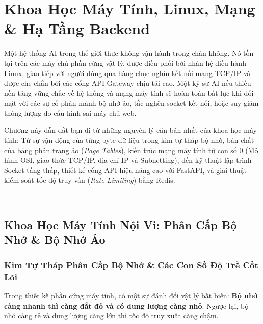 
\chapter{Khoa Học Máy Tính, Linux, Mạng \& Hạ Tầng Backend}
\label{ch:systems-networking}

Một hệ thống AI trong thế giới thực không vận hành trong chân không. Nó tồn tại trên các máy chủ phần cứng vật lý, được điều phối bởi nhân hệ điều hành Linux, giao tiếp với người dùng qua hàng chục nghìn kết nối mạng TCP/IP và được che chắn bởi các cổng API Gateway chịu tải cao. Một kỹ sư AI nếu thiếu nền tảng vững chắc về hệ thống và mạng máy tính sẽ hoàn toàn bất lực khi đối mặt với các sự cố phân mảnh bộ nhớ ảo, tắc nghẽn socket kết nối, hoặc suy giảm thông lượng do cấu hình sai máy chủ web.

Chương này dẫn dắt bạn đi từ những nguyên lý căn bản nhất của khoa học máy tính: Từ sự vận động của từng byte dữ liệu trong kim tự tháp bộ nhớ, bản chất của bảng phân trang ảo (\textit{Page Tables}), kiến trúc mạng máy tính từ con số 0 (Mô hình OSI, giao thức TCP/IP, địa chỉ IP và Subnetting), đến kỹ thuật lập trình Socket tầng thấp, thiết kế cổng API hiệu năng cao với FastAPI, và giải thuật kiểm soát tốc độ truy vấn (\textit{Rate Limiting}) bằng Redis.

---

\section{Khoa Học Máy Tính Nội Vi: Phân Cấp Bộ Nhớ \& Bộ Nhớ Ảo}
\label{sec:memory-hierarchy-paging}

\subsection{Kim Tự Tháp Phân Cấp Bộ Nhớ \& Các Con Số Độ Trễ Cốt Lõi}
Trong thiết kế phần cứng máy tính, có một sự đánh đổi vật lý bất biến: \textbf{Bộ nhớ càng nhanh thì càng đắt đỏ và có dung lượng càng nhỏ}. Ngược lại, bộ nhớ càng rẻ và dung lượng càng lớn thì tốc độ truy xuất càng chậm.

